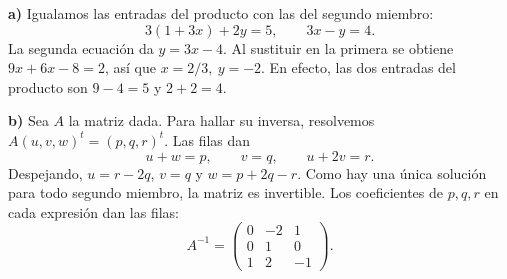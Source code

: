 \textbf{a)} Igualamos las entradas del producto con las del segundo miembro:
\[
 3(1+3x)+2y=5,\qquad 3x-y=4.
\]
La segunda ecuación da $y=3x-4$. Al sustituir en la primera se obtiene $9x+6x-8=2$, así que $\boxed{x=2/3,\ y=-2}$. En efecto, las dos entradas del producto son $9-4=5$ y $2+2=4$.

\textbf{b)} Sea $A$ la matriz dada. Para hallar su inversa, resolvemos $A(u,v,w)^t=(p,q,r)^t$. Las filas dan
\[
 u+w=p,\qquad v=q,\qquad u+2v=r.
\]
Despejando, $u=r-2q$, $v=q$ y $w=p+2q-r$. Como hay una única solución para todo segundo miembro, la matriz es invertible. Los coeficientes de $p,q,r$ en cada expresión dan las filas:
\[
 A^{-1}=\boxed{\begin{pmatrix}0&-2&1\\0&1&0\\1&2&-1\end{pmatrix}}.
\]

